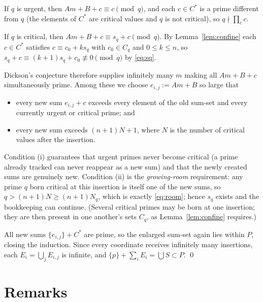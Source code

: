 \documentclass[11pt]{amsart}
\theoremstyle{remark}
\newcommand{\PP}{P}
\begin{document}
If $q$ is urgent, then $Am+B+c\equiv c\pmod q$, and each $c\in C^\ast$
is a prime different from $q$ (the elements of $C^\ast$ are critical
values and $q$ is not critical), so $q\nmid\prod_c c$.

If $q$ is critical, then $Am+B+c\equiv s_q+c \pmod q$.  By
Lemma~\ref{lem:confine} each $c\in C^\ast$ satisfies
$c\equiv c_0+k s_q$ with $c_0\in C_q$ and $0\le k\le n$, so
$s_q+c\equiv (k+1)s_q+c_0\not\equiv 0\pmod q$ by \eqref{eq:sq}.

Dickson's conjecture therefore supplies infinitely many $m$ making all
$Am+B+c$ simultaneously prime.  Among these we choose $e_{i,j}:=Am+B$
so large that
\begin{itemize}
\item[(i)] every new sum $e_{i,j}+c$ exceeds every element of the old
  sum-set and every currently urgent or critical prime; and
\item[(ii)] every new sum exceeds $(n+1)N+1$, where $N$ is the number
  of critical values after the insertion.
\end{itemize}
Condition (i) guarantees that urgent primes never become critical
(a prime already tracked can never reappear as a new sum) and that the
newly created sums are genuinely new.  Condition (ii) is the
\emph{growing-room} requirement: any prime $q$ born critical at this
insertion is itself one of the new sums, so $q>(n+1)N\ge(n+1)N_q$,
which is exactly \eqref{eq:room}; hence $s_q$ exists and the
bookkeeping can continue.  (Several critical primes may be born at one
insertion; they are then present in one another's sets $C_q$, as
Lemma~\ref{lem:confine} requires.)

All new sums $\{e_{i,j}\}+C^\ast$ are prime, so the enlarged sum-set
again lies within $\PP$, closing the induction.  Since every
coordinate receives infinitely many insertions, each
$E_i=\bigcup_j E_{i,j}$ is infinite, and
$\{p\}+\sum_i E_i=\bigcup S\subset\PP$.  \qed

\section{Remarks}
\end{document}
